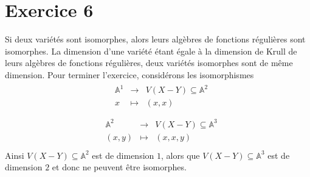     \section{Exercice 6}
        Si deux variétés sont isomorphes, alors leurs algèbres de fonctions régulières sont isomorphes. La dimension d'une variété étant égale à la dimension de Krull de leurs algèbres de fonctions régulières, deux variétés isomorphes sont de même dimension. Pour terminer l'exercice, considérons les isomorphismes
        \begin{align*}
            \begin{array}{cccc}
                & \mathbb{A}^1 & \to & V(X - Y) \subseteq \mathbb{A}^2 \\
                & x & \mapsto & (x, x) \\
            \end{array}
        \end{align*}
        \begin{align*}
            \begin{array}{cccc}
                & \mathbb{A}^2 & \to & V(X - Y) \subseteq \mathbb{A}^3 \\
                & (x,y) & \mapsto & (x, x, y) \\
            \end{array}
        \end{align*}
        Ainsi $V(X - Y) \subseteq \mathbb{A}^2$ est de dimension $1$, alors que $V(X - Y) \subseteq \mathbb{A}^3$ est de dimension $2$ et donc ne peuvent être isomorphes.

